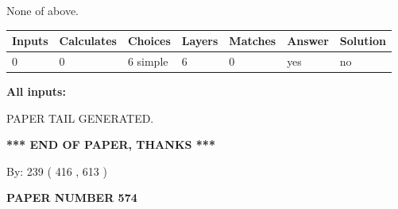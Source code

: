 \documentclass[12pt]{article}
\begin{document}
 
 None of above.
 
 
\noindent{}
 
 
   
   
   
   
\noindent\begin{tabular}{|l|l|l|l|l|l|l|}
 \hline
Inputs & Calculates & Choices & Layers & Matches & Answer & Solution \\ \hline
 0  & 
 0  & 
 6
  simple  
  & 
 6  & 
 0  & 
  yes & 
  no 
  \\ \hline
 \end{tabular}
   
   
   
   
\noindent{}
   
   
   
   
\noindent\vspace{0.1in}\hspace{-0.08in} {\textbf{\Large{All inputs: }}}
   
   
   
   
   
   
 \vspace{0.2in}
 
   
   
\vspace{2.0in} PAPER TAIL GENERATED.
   
   
   
   
\vspace{1.0in} 
{\textbf{\large{ *** END OF PAPER, THANKS *** }}} 
   
   
\hspace{1.0in} By: 
 239 ( 416 ,  613 )
   
   
   
   
\newpage 
\setcounter{page}{ 
   574001 } 
   
   
   
   
 {\textbf{ \Large{ PAPER NUMBER  574  }}}
   
   
\vspace{0.2in}
   
   
   
   
   
   
   
\end{document}
